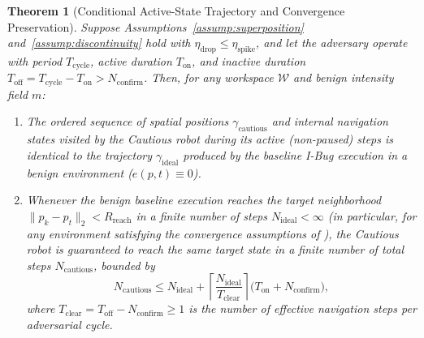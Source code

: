 \documentclass[12pt, a4paper]{article}
\newtheorem{theorem}{Theorem}
\begin{document}
\begin{theorem}[Conditional Active-State Trajectory and Convergence Preservation]
\label{thm:cautious_convergence}
Suppose Assumptions~\ref{assump:superposition} and~\ref{assump:discontinuity} hold with $\eta_{\text{drop}} \le \eta_{\text{spike}}$, and let the adversary operate with period $T_{\text{cycle}}$, active duration $T_{\text{on}}$, and inactive duration $T_{\text{off}} = T_{\text{cycle}} - T_{\text{on}} > N_{\text{confirm}}$. Then, for any workspace $\mathcal{W}$ and benign intensity field $m$:
\begin{enumerate}
    \item The ordered sequence of spatial positions $\gamma_{\text{cautious}}$ and internal navigation states visited by the Cautious robot during its active (non-paused) steps is identical to the trajectory $\gamma_{\text{ideal}}$ produced by the baseline I-Bug execution in a benign environment ($e(p, t) \equiv 0$).
    \item Whenever the benign baseline execution reaches the target neighborhood $\|p_k - p_t\|_2 < R_{\text{reach}}$ in a finite number of steps $N_{\text{ideal}} < \infty$ (in particular, for any environment satisfying the convergence assumptions of \cite{taylor2014intensity}), the Cautious robot is guaranteed to reach the same target state in a finite number of total steps $N_{\text{cautious}}$, bounded by
    \begin{equation}
        N_{\text{cautious}} \le N_{\text{ideal}} + \left\lceil \frac{N_{\text{ideal}}}{T_{\text{clear}}} \right\rceil \bigl(T_{\text{on}} + N_{\text{confirm}}\bigr),
        \label{eq:step_bound}
    \end{equation}
    where $T_{\text{clear}} = T_{\text{off}} - N_{\text{confirm}} \ge 1$ is the number of effective navigation steps per adversarial cycle.
\end{enumerate}
\end{theorem}
\end{document}

